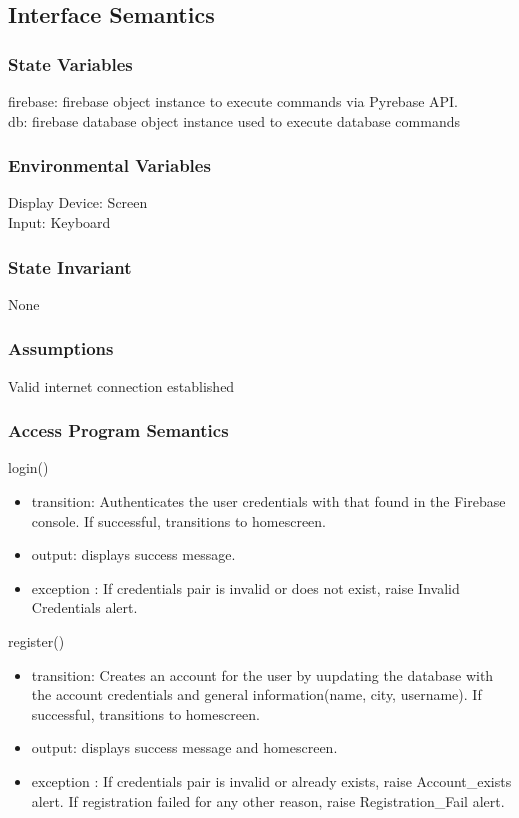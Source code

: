 \documentclass[12pt, titlepage]{article}
\begin{document}
\subsection{Interface Semantics}
\subsubsection{State Variables}
firebase: firebase object instance to execute commands via Pyrebase API.\\
db: firebase database object instance used to execute database commands\\

\subsubsection{Environmental Variables}
Display Device: Screen\\
Input: Keyboard

\subsubsection{State Invariant}
None

\subsubsection{Assumptions}
Valid internet connection established

\subsubsection{Access Program Semantics}
login()
\begin{itemize}
    \item transition: Authenticates the user credentials with that found in the Firebase console. If successful, transitions to homescreen.
    \item output: displays success message.
    \item exception : If credentials pair is invalid or does not exist, raise Invalid Credentials alert.
\end{itemize}


register()
\begin{itemize}
    \item transition: Creates an account for the user by uupdating the database with the account credentials and general information(name, city, username). If successful, transitions to homescreen.
    \item output: displays success message and homescreen.
    \item exception : If credentials pair is invalid or already exists, raise Account\_exists alert. If registration failed for any other reason, raise Registration\_Fail alert.
\end{itemize}
\end{document}
